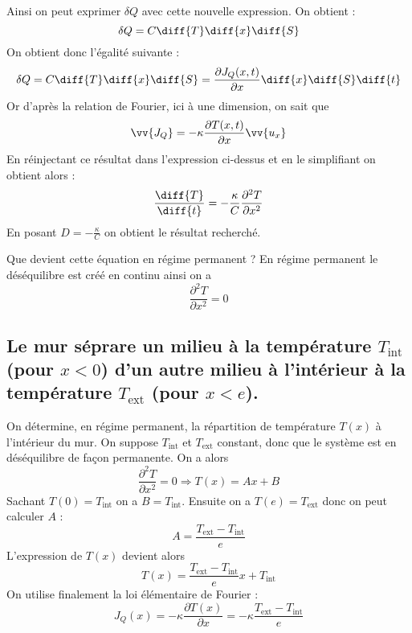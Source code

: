 \documentclass[a4paper,12pt]{article}
\begin{document}
Ainsi on peut exprimer $\delta Q$ avec cette nouvelle expression. On obtient :
\begin{equation}
	\delta Q = C \diff{T} \diff{x}\diff{S}
\end{equation}
On obtient donc l'égalité suivante :
\begin{equation}
	\delta Q = C \diff{T}\diff{x}\diff{S} = \frac{\partial J_Q (x,t)}{\partial x} \diff{x} \diff{S} \diff{t}
\end{equation}
Or d'après la relation de Fourier, ici à une dimension, on sait que 
\begin{equation}
	\vv{J_Q} = - \kappa \frac{\partial T(x,t)}{\partial x} \vv{u_x}
\end{equation}
En réinjectant ce résultat dans l'expression ci-dessus et en le simplifiant on obtient alors :
\begin{equation}
	\frac{\diff{T}}{\diff{t}} = -\frac{\kappa}{C} \frac{\partial^2 T}{\partial x^2}
\end{equation}
En posant $D = -\frac{\kappa}{C}$ on obtient le résultat recherché.

Que devient cette équation en régime permanent ? En régime permanent le déséquilibre est créé en continu ainsi on a
\begin{equation}
	\frac{\partial^2 T}{\partial x^2} = 0
\end{equation}

\subsection{Le mur séprare un milieu à la température $T_\text{int}$ (pour $x < 0$) d'un autre milieu à l'intérieur à la température $T_\text{ext}$ (pour $x < e$).}

On détermine, en régime permanent, la répartition de température $T(x)$ à l'intérieur du mur. On suppose $T_\text{int}$ et $T_\text{ext}$ constant, donc que le système est en déséquilibre de façon permanente. On a alors 
\begin{equation}
	\frac{\partial^2 T}{\partial x^2} = 0 \Rightarrow T(x) = Ax + B
\end{equation}
Sachant $T(0) = T_\text{int}$ on a $B = T_\text{int}$. Ensuite on a $T(e) = T_\text{ext}$ donc on peut calculer $A$ :
\begin{equation}
	A = \frac{T_\text{ext} - T_\text{int}}{e}
\end{equation}
L'expression de $T(x)$ devient alors
\begin{equation}
	T(x) = \frac{T_\text{ext} - T_\text{int}}{e} x + T_\text{int}
\end{equation}
On utilise finalement la loi élémentaire de Fourier :
\begin{equation}
	J_Q (x) = - \kappa \frac{\partial T(x)}{\partial x} = - \kappa \frac{T_\text{ext} - T_\text{int}}{e}
\end{equation}
\end{document}
